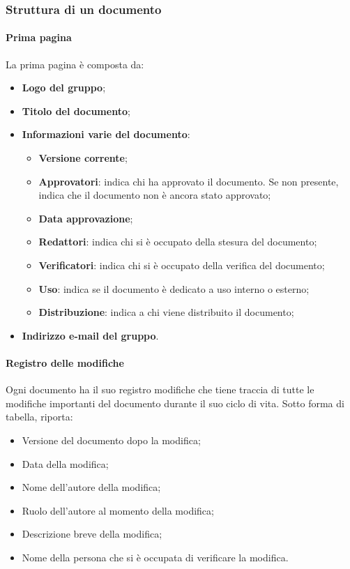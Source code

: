 \subsubsection{Struttura di un documento}
\paragraph{Prima pagina}
La prima pagina è composta da:
\begin{itemize}
  \item \textbf{Logo del gruppo};
  \item \textbf{Titolo del documento};
  \item \textbf{Informazioni varie del documento}:
      \begin{itemize}
      \item \textbf{Versione corrente};
      \item \textbf{Approvatori}: indica chi ha approvato il documento. Se non presente, indica che il documento non è ancora stato approvato;
      \item \textbf{Data approvazione};
      \item \textbf{Redattori}: indica chi si è occupato della stesura del documento;
      \item \textbf{Verificatori}: indica chi si è occupato della verifica del documento;
      \item \textbf{Uso}: indica se il documento è dedicato a uso interno o esterno;
      \item \textbf{Distribuzione}: indica a chi viene distribuito il documento;
        \end{itemize}
\item \textbf{Indirizzo e-mail del gruppo}.
\end{itemize}

\paragraph{Registro delle modifiche}
Ogni documento ha il suo registro modifiche che tiene traccia di tutte le modifiche importanti del documento durante il suo ciclo di vita.
Sotto forma di tabella, riporta:
  \begin{itemize}
  		\item Versione del documento dopo la modifica;
  		\item Data della modifica;
  		\item Nome dell’autore della modifica;
  		\item Ruolo dell’autore al momento della modifica;
  		\item Descrizione breve della modifica;
  		\item Nome della persona che si è occupata di verificare la modifica.
	\end{itemize}


